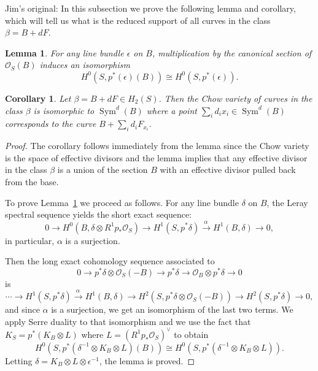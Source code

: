 \documentclass{amsart}
\newtheorem{lemma}[theorem]{Lemma}
\newtheorem{corollary}[theorem]{Corollary}
\theoremstyle{definition}
\renewcommand{\O}{\mathcal{O}}
\newcommand{\rt}[1]{\stackrel{#1\,}{\rightarrow}}
\newcommand{\Rt}[1]{\stackrel{#1\,}{\longrightarrow}}
\newcommand{\Sym}{\operatorname{Sym}}
\begin{document}
Jim's original:
In this subsection we prove the following lemma and corollary, which will tell us what is the reduced support of all curves in the class $\beta =B+dF$.

\begin{lemma}\label{lem: H0 (pi* (D) (B))=H0 (pi* (D))}
For any line bundle $\epsilon $ on $B$, multiplication by the
canonical section of $\O_S (B)$ induces an isomorphism
\[
H^{0} (S,p^{*} (\epsilon ) (B)) \cong H^{0} (S,p^{*} (\epsilon )).
\]
\end{lemma}

\begin{corollary} \label{cor: chow(beta) = sym (B)}
Let $\beta = B+dF \in H_{2} (S)$. Then the Chow variety of curves in
the class $\beta $ is isomorphic to $\Sym ^{d} (B)$ where a point
$\sum _{i}d_{i} x_{i}\in \Sym ^{d} (B)$ corresponds to the curve
$B+\sum _{i}d_{i} F_{x_{i}}$.
\end{corollary}

\begin{proof}
The corollary follows immediately from the lemma since the Chow
variety is the space of effective divisors and the lemma implies that
any effective divisor in the class $\beta $ is a union of the section
$B$ with an effective divisor pulled back from the base.

To prove Lemma~\ref{lem: H0 (pi* (D) (B))=H0 (pi* (D))} we proceed as
follows. For any line bundle $\delta $ on $B$, the Leray spectral
sequence yields the short exact sequence:
\[
0\to H^{0} (B,\delta \otimes R^{1}p _{*}\O_S )\to H^{1} (S,p^{*}\delta )\Rt{\alpha } H^{1} (B,\delta )\to 0,
\]
in particular, $\alpha $ is a surjection.

Then the long exact cohomology sequence associated to 
\[
0\to p^{*}\delta \otimes \O_S (-B)\to p^{*}\delta \to \O _{B}\otimes p^{*}\delta \to 0
\]
is
\[
\dotsb \to H^{1} (S,p ^{*} \delta )\rt{\alpha }H^{1} (B,\delta )\to H^{2} (S,p ^{*}\delta \otimes \O_S (-B))\to H^{2} (S,p ^{*}\delta )\to 0,
\]
and since $\alpha $ is a surjection, we get an isomorphism of the last
two terms. We apply Serre duality to that isomorphism and we use the
fact that $K_{S} = p ^{*} (K_{B}\otimes L)$ where $L = \left(R^1 p
_{*}\O _{S} \right)^{\vee }$ \cite[Thm.~12.1]{BPV} to obtain
\[
H^{0} (S,p ^{*} (\delta ^{-1}\otimes K_{B}\otimes L) (B)) \cong H^{0}(S,p ^{*} (\delta ^{-1}\otimes K_{B}\otimes L)).
\]
Letting $\delta =K_{B}\otimes L\otimes \epsilon ^{-1}$, the lemma is
proved. 
\end{proof}
\end{document}
